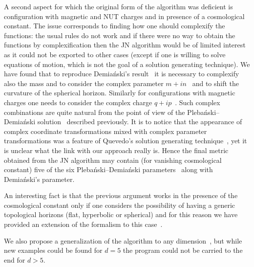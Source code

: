 A second aspect for which the original form of the algorithm was deficient is configuration with magnetic and NUT charges and in presence of a cosmological constant.
The issue corresponds to finding how one should complexify the functions: the usual rules do not work and if there were no way to obtain the functions by complexification then the JN algorithm would be of limited interest as it could not be exported to other cases (except if one is willing to solve equations of motion, which is not the goal of a solution generating technique).
We have found that to reproduce Demiański's result~\cite{Demianski:1972:NewKerrlikeSpacetime} it is necessary to complexify also the mass and to consider the complex parameter $m + i n$~\cite{Erbin:2016:DecipheringGeneralizingDemianskiJanisNewman, Erbin:2015:SupergravityComplexParameters} and to shift the curvature of the spherical horizon.
Similarly for configurations with magnetic charges one needs to consider the complex charge $q + i p$~\cite{Erbin:2015:SupergravityComplexParameters}.
Such complex combinations are quite natural from the point of view of the Plebański--Demiański solution~\cite{Plebanski:1975:ClassSolutionsEinsteinMaxwell, Plebanski:1976:RotatingChargedUniformly} described previously.
It is to notice that the appearance of complex coordinate transformations mixed with complex parameter transformations was a feature of Quevedo's solution generating technique~\cite{Quevedo:1992:ComplexTransformationsCurvature, Quevedo:1992:DeterminationMetricCurvature}, yet it is unclear what the link with our approach really is.
Hence the final metric obtained from the JN algorithm may contain (for vanishing cosmological constant) five of the six Plebański--Demiański parameters~\cite{Plebanski:1975:ClassSolutionsEinsteinMaxwell, Plebanski:1976:RotatingChargedUniformly} along with Demiański's parameter.

An interesting fact is that the previous argument works in the presence of the cosmological constant only if one considers the possibility of having a generic topological horizons (flat, hyperbolic or spherical) and for this reason we have provided an extension of the formalism to this case~\cite{Erbin:2016:DecipheringGeneralizingDemianskiJanisNewman}.

We also propose a generalization of the algorithm to any dimension~\cite{Erbin:2015:FivedimensionalJanisNewmanAlgorithm}, but while new examples could be found for $d = 5$ the program could not be carried to the end for $d > 5$.


